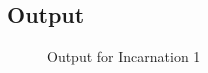 \documentclass{report}
\begin{document}
    \subsection{Output}
    \begin{figure}[h!]
      \centering
      \caption{Output for Incarnation 1}
      \label{fig:Text-based output}
    \end{figure}
    \pagebreak



\printindex
\end{document}
